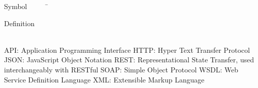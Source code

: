 

\begin{tabbing}
Symbol~~~~~\= \ \ \ \ \ \ \ \ \ \ \ \ \ \ \ \ \ \ \ \ \ \ \ \ \ \ \ \ \ \ \ \ \ \ \ \  \parbox{5in}{Definition}\\

\addsymbol \mbox{API}: {Application Programming Interface}
\addsymbol \mbox{HTTP}: {Hyper Text Transfer Protocol}
\addsymbol \mbox{JSON}: {JavaScript Object Notation}
\addsymbol \mbox{REST}: {Representational State Transfer, used interchangeably with RESTful}
\addsymbol \mbox{SOAP}: {Simple Object Protocol}
\addsymbol \mbox{WSDL}: {Web Service Definition Language}
\addsymbol \mbox{XML}: {Extensible Markup Language}





\end{tabbing}
